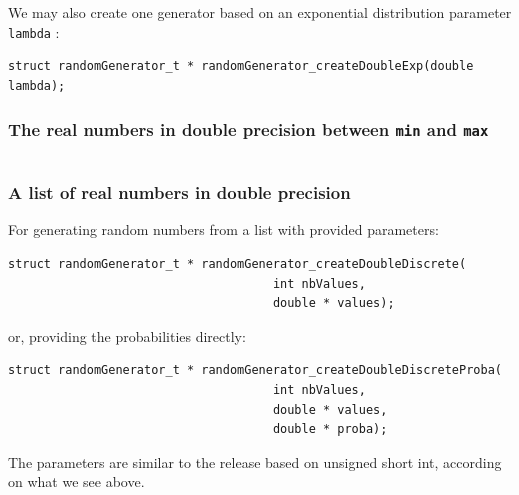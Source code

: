    We may also create one generator based on an exponential distribution
parameter {\tt lambda} :

\begin{verbatim}
struct randomGenerator_t * randomGenerator_createDoubleExp(double lambda);
\end{verbatim}

%
\subsubsection{The real numbers in double precision between {\tt min} and {\tt max}}

\begin{verbatim}
\end{verbatim}

%
\subsubsection{A list of real numbers in double precision}

   For generating random numbers from a list with provided
parameters:

\begin{verbatim}
struct randomGenerator_t * randomGenerator_createDoubleDiscrete(
                                     int nbValues,
                                     double * values);
\end{verbatim}

   or, providing the probabilities directly:

\begin{verbatim}
struct randomGenerator_t * randomGenerator_createDoubleDiscreteProba(
                                     int nbValues,
                                     double * values,
                                     double * proba);
\end{verbatim}

   The parameters are similar to the release based on unsigned short 
int, according on what we see above.

%

